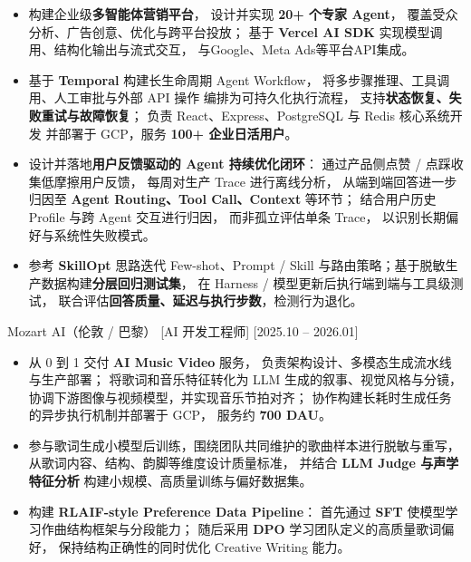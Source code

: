 \documentclass{resume}
\newlength{\EntryGap}
\newlength{\BulletGap}
\newenvironment{resumeBullets}{%
  \begin{itemize}[
    label=\textbullet,
    leftmargin=12pt,
    labelsep=5pt,
    itemsep=\BulletGap,
    parsep=0pt,
    topsep=3pt,
    partopsep=0pt
  ]
}{%
  \end{itemize}
}
\begin{document}
\begin{resumeBullets}
  \item 构建企业级\textbf{多智能体营销平台}，
  设计并实现 \textbf{20+ 个专家 Agent}，
  覆盖受众分析、广告创意、优化与跨平台投放；
  基于 \textbf{Vercel AI SDK}
  实现模型调用、结构化输出与流式交互，
  与Google、Meta Ads等平台API集成。

  \item 基于 \textbf{Temporal}
  构建长生命周期 Agent Workflow，
  将多步骤推理、工具调用、人工审批与外部 API 操作
  编排为可持久化执行流程，
  支持\textbf{状态恢复、失败重试与故障恢复}；
  负责 React、Express、PostgreSQL 与 Redis 核心系统开发
  并部署于 GCP，服务 \textbf{100+ 企业日活用户}。

  \item 设计并落地\textbf{用户反馈驱动的 Agent 持续优化闭环}：
  通过产品侧点赞 / 点踩收集低摩擦用户反馈，
  每周对生产 Trace 进行离线分析，
  从端到端回答进一步归因至
  \textbf{Agent Routing、Tool Call、Context} 等环节；
  结合用户历史 Profile 与跨 Agent 交互进行归因，
  而非孤立评估单条 Trace，
  以识别长期偏好与系统性失败模式。

  \item 参考 \textbf{SkillOpt} 思路迭代 Few-shot、Prompt / Skill
  与路由策略；基于脱敏生产数据构建\textbf{分层回归测试集}，
  在 Harness / 模型更新后执行端到端与工具级测试，
  联合评估\textbf{回答质量、延迟与执行步数}，检测行为退化。

\end{resumeBullets}

\vspace{\EntryGap}

\ResumeItem
  {Mozart AI（伦敦 / 巴黎）}
  [AI 开发工程师]
  [2025.10 -- 2026.01]

\begin{resumeBullets}
  \item 从 0 到 1 交付 \textbf{AI Music Video} 服务，
  负责架构设计、多模态生成流水线与生产部署；
  将歌词和音乐特征转化为 LLM 生成的叙事、视觉风格与分镜，
  协调下游图像与视频模型，并实现音乐节拍对齐；
  协作构建长耗时生成任务的异步执行机制并部署于 GCP，
  服务约 \textbf{700 DAU}。

  \item 参与歌词生成小模型后训练，围绕团队共同维护的歌曲样本进行脱敏与重写，
  从歌词内容、结构、韵脚等维度设计质量标准，
  并结合 \textbf{LLM Judge 与声学特征分析}
  构建小规模、高质量训练与偏好数据集。

  \item 构建 \textbf{RLAIF-style Preference Data Pipeline}：
  首先通过 \textbf{SFT} 使模型学习作曲结构框架与分段能力；
  随后采用 \textbf{DPO} 学习团队定义的高质量歌词偏好，
  保持结构正确性的同时优化 Creative Writing 能力。
\end{resumeBullets}
\end{document}
